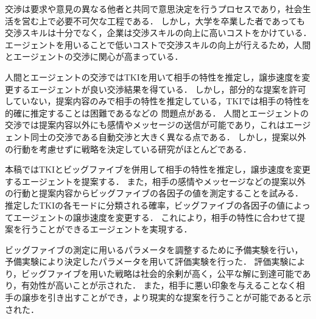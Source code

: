 
交渉は要求や意見の異なる他者と共同で意思決定を行うプロセスであり，社会生活を営む上で必要不可欠な工程である．
しかし，大学を卒業した者であっても交渉スキルは十分でなく，企業は交渉スキルの向上に高いコストをかけている．
エージェントを用いることで低いコストで交渉スキルの向上が行えるため，人間とエージェントの交渉に関心が高まっている．

人間とエージェントの交渉ではTKIを用いて相手の特性を推定し，譲歩速度を変更するエージェントが良い交渉結果を得ている．
しかし，部分的な提案を許可していない，提案内容のみで相手の特性を推定している，TKIでは相手の特性を的確に推定することは困難であるなどの
問題点がある．
人間とエージェントの交渉では提案内容以外にも感情やメッセージの送信が可能であり，これはエージェント同士の交渉である自動交渉と大きく異なる点である．
しかし，提案以外の行動を考慮せずに戦略を決定している研究がほとんどである．

本稿ではTKIとビッグファイブを併用して相手の特性を推定し，譲歩速度を変更するエージェントを提案する．
また，相手の感情やメッセージなどの提案以外の行動と提案内容からビッグファイブの各因子の値を測定することを試みる．
推定したTKIの各モードに分類される確率，ビッグファイブの各因子の値によってエージェントの譲歩速度を変更する．
これにより，相手の特性に合わせて提案を行うことができるエージェントを実現する．

ビッグファイブの測定に用いるパラメータを調整するために予備実験を行い，
予備実験により決定したパラメータを用いて評価実験を行った．
評価実験により，ビッグファイブを用いた戦略は社会的余剰が高く，公平な解に到達可能であり，有効性が高いことが示された．
また，相手に悪い印象を与えることなく相手の譲歩を引き出すことができ，より現実的な提案を行うことが可能であると示された．
